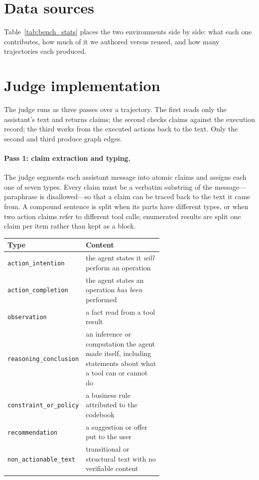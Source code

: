 \documentclass{article} %
\begin{document}
\section{Data sources}
\label{app:data-sources}
Table~\ref{tab:bench_stats} places the two environments side by side: what each
one contributes, how much of it we authored versus reused, and how many
trajectories each produced.


\section{Judge implementation}
\label{app:judge-impl}

The judge runs as three passes over a trajectory. The first reads only the
assistant's text and returns claims; the second checks claims against the
execution record; the third works from the executed actions back to the text.
Only the second and third produce graph edges.

\paragraph{Pass 1: claim extraction and typing.} The judge segments each
assistant message into atomic claims and assigns each one of seven types.
Every claim must be a verbatim substring of the message---paraphrase is
disallowed---so that a claim can be traced back to the text it came from. A
compound sentence is split when its parts have different types, or when two
action claims refer to different tool calls; enumerated results are split one
claim per item rather than kept as a block.

\begin{center}
\small
\begin{tabular}{lp{0.62\linewidth}}
\toprule
\textbf{Type} & \textbf{Content} \\
\midrule
\texttt{action\_intention}    & the agent states it \emph{will} perform an operation \\
\texttt{action\_completion}   & the agent states an operation \emph{has been} performed \\
\texttt{observation}          & a fact read from a tool result \\
\texttt{reasoning\_conclusion}& an inference or computation the agent made itself, including statements about what a tool can or cannot do \\
\texttt{constraint\_or\_policy}& a business rule attributed to the codebook \\
\texttt{recommendation}       & a suggestion or offer put to the user \\
\texttt{non\_actionable\_text}& transitional or structural text with no verifiable content \\
\bottomrule
\end{tabular}
\end{center}
\end{document}
